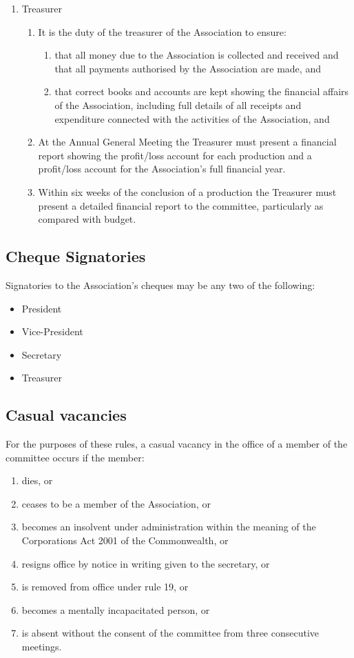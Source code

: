\documentclass{article}
\begin{document}
\begin{enumerate}
\begin{enumerate}
    \end{enumerate}
  \item Treasurer
    \begin{enumerate}
      \item It is the duty of the treasurer of the Association to ensure:
        \begin{enumerate}
          \item that all money due to the Association is collected and received and that all payments authorised by the Association are made, and
          \item that correct books and accounts are kept showing the financial affairs of the Association, including full details of all receipts and expenditure connected with the activities of the Association, and
        \end{enumerate}
      \item At the Annual General Meeting the Treasurer must present a financial report showing the profit/loss account for each production and a profit/loss account for the Association’s full financial year.
      \item Within six weeks of the conclusion of a production the Treasurer must present a detailed financial report to the committee, particularly as compared with budget.
    \end{enumerate}
\end{enumerate}
\subsection{Cheque Signatories}
Signatories to the Association’s cheques may be any two of the following:
\begin{itemize}
  \item President
  \item Vice-President
  \item Secretary
  \item Treasurer
\end{itemize}
\subsection{Casual vacancies}
For the purposes of these rules, a casual vacancy in the office of a member of the committee occurs if the member:
\begin{enumerate}
  \item dies, or
  \item ceases to be a member of the Association, or
  \item becomes an insolvent under administration within the meaning of the Corporations Act 2001 of the Commonwealth, or
  \item resigns office by notice in writing given to the secretary, or
  \item is removed from office under rule 19, or
  \item becomes a mentally incapacitated person, or
  \item is absent without the consent of the committee from three consecutive meetings.
\end{enumerate}
\end{document}
